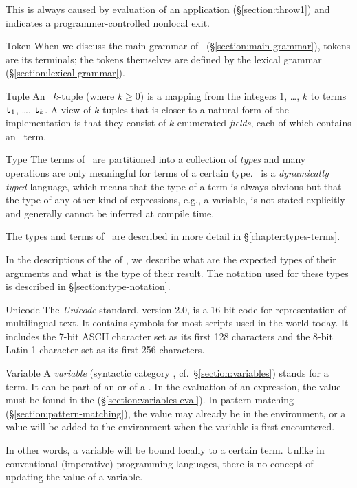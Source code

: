 \begin{Lentry}
This is always caused by evaluation of an application 
(\S\ref{section:throw1}) and indicates a programmer-controlled
nonlocal exit.

\item[Token]
When we discuss the main grammar of \Erlang\
(\S\ref{section:main-grammar}), tokens are its terminals; the tokens
themselves are defined by the lexical grammar
(\S\ref{section:lexical-grammar}).

\item[Tuple]
An \Erlang\ $k$-tuple (where $k\geq0$) is a mapping from the integers
$1$, \ldots, $k$ to terms ${\tt{\sl t}}_1$, \ldots, ${\tt{\sl t}}_k$.  A view
of $k$-tuples that is closer to
\ifStd a natural form of \else the \fi
implementation is that they consist of $k$ enumerated \emph{fields},
each of which contains an \Erlang\ term.

\item[Type]
The terms of \Erlang\ are partitioned into a collection of
\emph{types} and many operations are only meaningful for terms of a
certain type.  \Erlang\ is a \emph{dynamically typed} language, which
means that the type of a term is always obvious but that the type of
any other kind of expressions, e.g., a variable, is not stated
explicitly and generally cannot be inferred at compile time.

The types and terms of \Erlang\ are described in more detail in
\S\ref{chapter:types-terms}.

In the descriptions of the  of \Erlang, we
describe what are the expected types of their arguments and what
is the type of their result.  The notation used for these types is described in
\S\ref{section:type-notation}.

\item[Unicode]
The \emph{Unicode} standard, version 2.0, \cite{unicode} is a 16-bit
code for representation of multilingual text.  It contains symbols for
most scripts used in the world today.  It includes the 7-bit
ASCII character set as its first 128 characters and the
8-bit Latin-1\index{Latin-1} character set as its first 256
characters.

\item[Variable]
A \emph{variable} (syntactic category , cf.\ \S\ref{section:variables})
stands for a term.
It can be part of an  or of a .
In the evaluation of an expression, the value must be found in the
\B{environment} (\S\ref{section:variables-eval}).
In pattern matching (\S\ref{section:pattern-matching}),
the value may already be in the
environment, or a value will be added to the environment when the variable
is first encountered.

In other words, a variable will be bound locally to a certain term.
Unlike in conventional (imperative) programming languages, there is no concept
of updating the value of a variable.
\end{Lentry}
